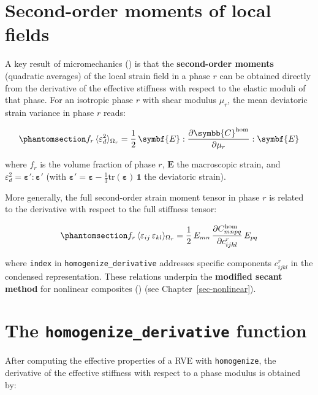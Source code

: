 \documentclass[
  a4paper,
  numbers=noendperiod,
  DIV=12]{scrreprt}
\newcommand{\uu}[1]{{\symbf{{#1}}}}
\newcommand{\uuuu}[1]{{\symbb{{#1}}}}
\begin{document}
\section{Second-order moments of local fields}\label{sec-second-moments}

A key result of micromechanics ()
is that the \textbf{second-order moments} (quadratic averages) of the
local strain field in a phase \(r\) can be obtained directly from the
derivative of the effective stiffness with respect to the elastic moduli
of that phase. For an isotropic phase \(r\) with shear modulus
\(\mu_r\), the mean deviatoric strain variance in phase \(r\) reads:

\begin{equation}\protect\phantomsection\label{eq-kreher-iso}{
f_r\,\langle\varepsilon_d^2\rangle_{\Omega_r} = \frac{1}{2}\,\uu{E}:\frac{\partial\uuuu{C}^{\rm hom}}{\partial\mu_r}:\uu{E}
}\end{equation}

where \(f_r\) is the volume fraction of phase \(r\), \(\uu{E}\) the
macroscopic strain, and
\(\varepsilon_d^2 = \uu{\varepsilon}':\uu{\varepsilon}'\) (with
\(\uu{\varepsilon}' = \uu{\varepsilon} - \frac{1}{3}\mathrm{tr}(\uu{\varepsilon})\,\uu{1}\)
the deviatoric strain).

More generally, the full second-order strain moment tensor in phase
\(r\) is related to the derivative with respect to the full stiffness
tensor:

\begin{equation}\protect\phantomsection\label{eq-kreher-aniso}{
f_r\,\langle\varepsilon_{ij}\,\varepsilon_{kl}\rangle_{\Omega_r} = \frac{1}{2}\,E_{mn}\,\frac{\partial C^{\rm hom}_{mnpq}}{\partial c^r_{ijkl}}\,E_{pq}
}\end{equation}

where \texttt{index} in \texttt{homogenize\_derivative} addresses
specific components \(c^r_{ijkl}\) in the condensed representation.
These relations underpin the \textbf{modified secant method} for
nonlinear composites () (see
Chapter~\ref{sec-nonlinear}).

\section{\texorpdfstring{The \texttt{homogenize\_derivative}
function}{The homogenize\_derivative function}}\label{sec-homogenize-derivative}

After computing the effective properties of a RVE with
\texttt{homogenize}, the derivative of the effective stiffness with
respect to a phase modulus is obtained by:
\end{document}
